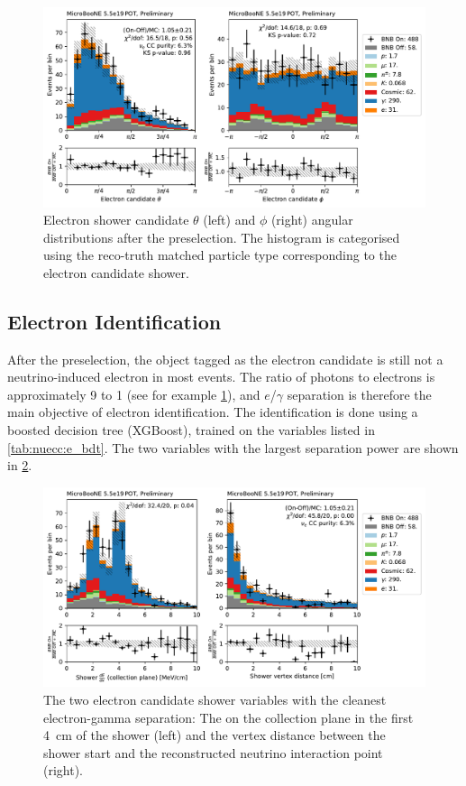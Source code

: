 \begin{figure}[htb]
    \centering
    \includegraphics[height=0.27\textheight]{NueCCsel/Images/datamc/e_cand_theta_phi.pdf}
    \caption[Electron shower candidate $\theta$ and $\phi$ angles after the preselection]{Electron shower candidate $\theta$ (left) and $\phi$ (right) angular distributions after the preselection. The histogram is categorised using the reco-truth matched particle type corresponding to the electron candidate shower.}
    \label{fig:nuecc:theta_phi}
\end{figure}

\subsection{Electron Identification}
\label{sc:nuecc:e_pid}

After the preselection, the object tagged as the electron candidate is still not a neutrino-induced electron in most events. The ratio of photons to electrons is approximately 9 to 1 (see for example \cref{fig:nuecc:theta_phi}), and $e$/$\gamma$ separation is therefore the main objective of electron identification. The identification is done using a boosted decision tree (XGBoost), trained on the variables listed in \cref{tab:nuecc:e_bdt}. The two variables with the largest separation power are shown in \cref{fig:e_cand_1}.

\begin{figure}[htb] 
    \centering
    \includegraphics[height=0.27\textheight]{NueCCsel/Images/datamc/e_cand_1.pdf}
    \caption{\label{fig:e_cand_1} The two electron candidate shower variables with the cleanest electron-gamma separation: The \dedx on the collection plane in the first \SI{4}{\cm} of the shower (left) and the vertex distance between the shower start and the reconstructed neutrino interaction point (right).}
\end{figure}

